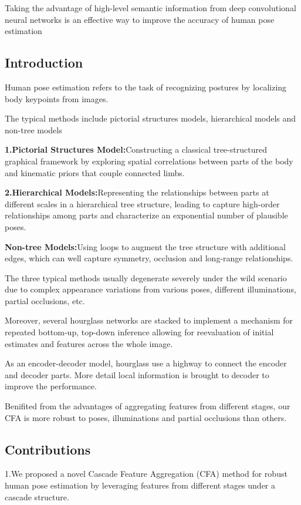 \documentclass[11pt]{article}
\begin{document}
Taking the advantage of high-level semantic information from deep convolutional neural networks is an effective way to improve the accuracy of human pose estimation
\subsection{Introduction}
Human pose estimation refers to the task of recognizing postures by localizing body keypoints from 
images.

The typical methods include pictorial structures models, hierarchical models and 
non-tree models

\textbf{1.Pictorial Structures Model:}Constructing a classical tree-structured graphical framework by exploring spatial correlations between parts of the body and kinematic priors that couple connected limbs.

\textbf{2.Hierarchical Models:}Representing the relationships between parts at different scales in a 
hierarchical tree structure, leading to capture high-order relationships among parts and characterize an exponential number of plausible poses.

\textbf{Non-tree Models:}Using loops to augment the tree structure with additional edges, which can well capture symmetry, occlusion and long-range relationships. 

The three typical methods usually degenerate severely under the wild scenario due to complex appearance variations from various poses, different illuminations, partial occlusions, etc.

Moreover, several hourglass networks are stacked to implement a mechanism for repeated bottom-up, top-down inference allowing for reevaluation of initial estimates and features across the whole image.

As an encoder-decoder model, hourglass use a highway to connect the encoder and decoder parts. More detail local information is brought to decoder to improve the performance.

Benifited from the advantages of aggregating features from different stages, our CFA is more robust to poses, illuminations and partial occlusions than others.
\subsection{Contributions}
1.We proposed a novel Cascade Feature Aggregation (CFA) method for robust human pose estimation 
by leveraging features from different stages under a cascade structure.
\end{document}

